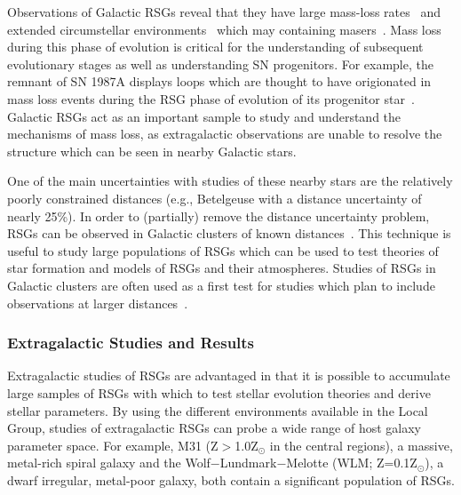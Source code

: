 Observations of Galactic RSGs reveal that they have large mass-loss rates~\citep[10$^{-(6\pm 1)}$M$_{\odot}$yr$^{-1}$;][]{Danchi94, Richards13} and extended circumstellar environments~\citep{Smith01} which may containing masers~\citep{Schuster06}.
Mass loss during this phase of evolution is critical for the understanding of subsequent evolutionary stages as well as understanding SN progenitors.
For example, the remnant of SN 1987A displays loops which are thought to have origionated in mass loss events during the RSG phase of evolution of its progenitor star~\citep[][and references therein]{Humphreys13}.
Galactic RSGs act as an important sample to study and understand the mechanisms of mass loss, as extragalactic observations are unable to resolve the structure which can be seen in nearby Galactic stars.

One of the main uncertainties with studies of these nearby stars are the relatively poorly constrained distances (e.g., Betelgeuse with a distance uncertainty of nearly 25\%).
In order to (partially) remove the distance uncertainty problem, RSGs can be observed in Galactic clusters of known distances~\citep[e.g.][]{Humphreys78, Mel'Nik95}.
This technique is useful to study large populations of RSGs which can be used to test theories of star formation and models of RSGs and their atmospheres.
Studies of RSGs in Galactic clusters are often used as a first test for studies which plan to include observations at larger distances~\citep[e.g.][]{Levesque05,Levesque06, 2010MNRAS.407.1203D,2013ApJ...767....3D}.

\subsubsection{Extragalactic Studies and Results}\label{extragalactic RSGs}

Extragalactic studies of RSGs are advantaged in that it is possible to accumulate large samples of RSGs with which to test stellar evolution theories and derive stellar parameters.
By using the different environments available in the Local Group, studies of extragalactic RSGs can probe a wide range of host galaxy parameter space.
For example, M31 (Z$>$1.0Z$_{\odot}$ in the central regions), a massive, metal-rich spiral galaxy and the Wolf$-$Lundmark$-$Melotte (WLM; Z=0.1Z$_{\odot}$), a dwarf irregular, metal-poor galaxy, both contain a significant population of RSGs.

